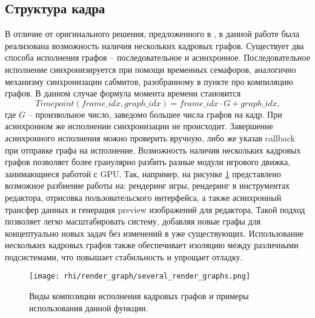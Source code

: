 \subsection{Структура кадра}
В отличие от оригинального решения, предложенного в \cite{frame_graph_frostbite}, в данной работе была реализована возможность наличия нескольких кадровых графов. Существует два способа исполнения графов -- последовательное и асинхронное. Последовательное исполнение синхронизируется при помощи временных семафоров, аналогично механизму синхронизации сабмитов, разобранному в пункте про компиляцию графов. В данном случае формула момента времени становится $$Timepoint(frame\_idx, graph\_idx) = frame\_idx \cdot G + graph\_idx\text{,}$$где $G$ -- произвольное число, заведомо большее числа графов на кадр. При асинхронном же исполнении синхронизации не происходит. Завершение асинхронного исполнения можно проверить вручную, либо же указав callback при отправке графа на исполнение. Возможность наличия нескольких кадровых графов позволяет более гранулярно разбить разные модули игрового движка, занимающиеся работой с GPU. Так, например, на рисунке \ref{fig:several_render_graphs} представлено возможное разбиение работы на: рендеринг игры, рендеринг в инструментах редактора, отрисовка пользовательского интерфейса, а также асинхронный трансфер данных и генерация preview изображений для редактора. Такой подход позволяет легко масштабировать систему, добавляя новые графы для концептуально новых задач без изменений в уже существующих. Использование нескольких кадровых графов также обеспечивает изоляцию между различными подсистемами, что повышает стабильность и упрощает отладку.

\begin{figure}[h]
    \centering
    \texttt{[image: rhi/render\_graph/several\_render\_graphs.png]}
    \caption{Виды композиции исполнения кадровых графов и примеры использования данной функции.}
    \label{fig:several_render_graphs}
\end{figure}